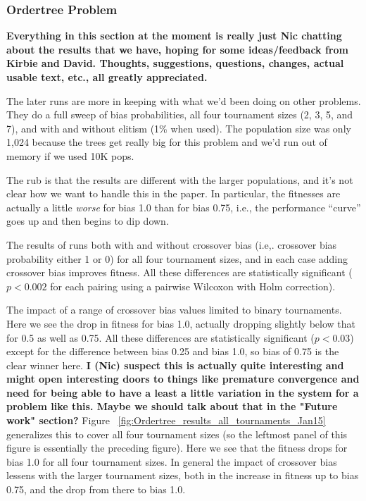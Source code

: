 \documentclass{sig-alternate}
\begin{document}
\subsubsection{Ordertree Problem}

\textbf{Everything in this section at the moment is really just Nic chatting about the results that we have, hoping for 
some ideas/feedback from Kirbie and David. Thoughts, suggestions, questions, changes, actual usable text, etc., all 
greatly appreciated.}

The later runs are more in keeping with what we'd been doing on other problems. They do a full sweep of bias 
probabilities, all four tournament sizes (2, 3, 5, and 7), and with and without elitism (1\% when used). The population 
size was only 1,024 because the trees get really big for this problem and we'd run out of memory if we used 10K 
pops.

The rub is that the results are different with the larger populations, and it's not clear how we want to handle this in the 
paper. In particular, the fitnesses are actually a little \emph{worse} for bias 1.0 than for bias 0.75, i.e., the performance 
``curve'' goes up and then begins to dip down.

The results of runs both with and without crossover bias (i.e,. 
crossover bias probability either 1 or 0) for all four tournament sizes, and in each case adding crossover bias 
improves fitness. All these differences are statistically significant ($p < 0.002$ for each pairing using a pairwise 
Wilcoxon with Holm correction).

The impact of a range of crossover bias values 
limited to binary tournaments. Here we see the drop in fitness for bias 1.0, actually dropping slightly below that for 0.5 
as well as 0.75. All these differences are statistically significant ($p < 0.03$) except for the difference between bias 
0.25 and bias 1.0, so bias of 0.75 is the clear winner here. \textbf{I (Nic) suspect this is actually quite interesting and 
might open interesting doors to things like premature convergence and need for being able to have a least a little 
variation in the system for a problem like this. Maybe we should talk about that in the "Future work" section?} Figure~
\ref{fig:Ordertree_results_all_tournaments_Jan15} generalizes this to cover all four tournament sizes (so the leftmost 
panel of this figure is essentially the preceding figure). Here we see that the fitness drops for bias 1.0 for all four 
tournament sizes. In general the impact of crossover bias lessens with the larger tournament sizes, both in the 
increase in fitness up to bias 0.75, and the drop from there to bias 1.0.
\end{document}
